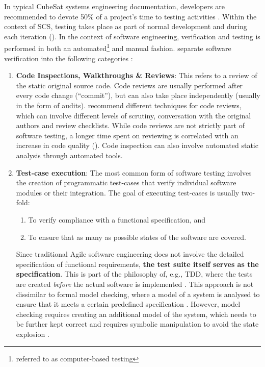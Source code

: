 \documentclass[a4paper,nobib,justified,final]{tufte-book}
\begin{document}
In typical CubeSat systems engineering documentation, developers are recommended to devote 50\% of a project's time to testing activities \autocite{venturiniImprovingMissionSuccess2017}. Within the context of \acs{SCS}, testing takes place as part of normal development and during each iteration (). In the context of software engineering, verification and testing is performed in both an automated\footnote{referred to as computer-based testing} and manual fashion. \citeauthor{myersArtSoftwareTesting2012} separate software verification into the following categories \autocite{myersArtSoftwareTesting2012}:
\begin{enumerate}
	\item \textbf{Code Inspections, Walkthroughs \& Reviews}: This refers to a review of the static original source code. Code reviews are usually performed after every code change (``commit''), but can also take place independently (usually in the form of audits).  \citeauthor{myersArtSoftwareTesting2012} recommend different techniques for code reviews, which can involve different levels of scrutiny, conversation with the original authors and review checklists. While code reviews are not strictly part of software testing, a longer time spent on reviewing is correlated with an increase in code quality (). Code inspection can also involve automated static analysis through automated tools.
	
	\item \textbf{Test-case execution}: The most common form of software testing involves the creation of programmatic test-cases that verify individual software modules or their integration. The goal of executing test-cases is usually two-fold:
	\begin{enumerate}[itemsep=-2ex]
		\item To verify compliance with a functional specification, and
		\item To ensure that as many as possible states of the software are covered.
	\end{enumerate}

	Since traditional Agile software engineering does not involve the detailed specification of functional requirements, \textbf{the test suite itself serves as the specification}. This is part of the philosophy of, e.g., \acf{TDD}, where the tests are created \emph{before} the actual software is implemented \autocite{beckTestDrivenDevelopment2002}. This approach is not dissimilar to formal model checking, where a model of a system is analysed to ensure that it meets a certain predefined specification \autocite{berardSystemsSoftwareVerification2001}. However, model checking requires creating an additional model of the system, which needs to be further kept correct and requires symbolic manipulation to avoid the state explosion \cite{berardSystemsSoftwareVerification2001}. 


\end{enumerate}
\end{document}
